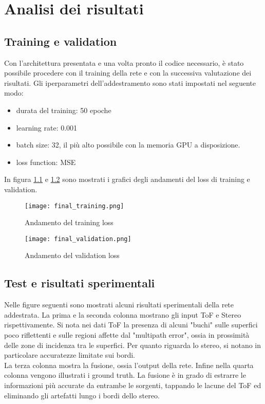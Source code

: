 \chapter{Analisi dei risultati}

\section{Training e validation}
Con l'architettura presentata e una volta pronto il codice necessario, è stato possibile procedere con il training della rete e con la successiva valutazione dei risultati.
Gli iperparametri dell'addestramento sono stati impostati nel seguente modo:
\begin{itemize}
    \item durata del training: 50 epoche
    \item learning rate: 0.001
    \item batch size: 32, il più alto possibile con la memoria GPU a disposizione.
    \item loss function: MSE
\end{itemize}
In figura \ref{training} e \ref{validation} sono mostrati i grafici degli andamenti del loss di training e validation.
\begin{figure}[H]
    \centering
    \texttt{[image: final\_training.png]}
    \caption[Andamento del training loss]{Andamento del training loss}
    \label{training}
\end{figure}

\begin{figure}[H]
    \centering
    \texttt{[image: final\_validation.png]}
    \caption[Andamento del validation loss]{Andamento del validation loss}
    \label{validation}
\end{figure}

\section{Test e risultati sperimentali}
Nelle figure seguenti sono mostrati alcuni risultati sperimentali della rete addestrata. La prima e la seconda colonna mostrano gli input ToF e Stereo rispettivamente. Si nota nei dati ToF la presenza di alcuni "buchi" sulle superfici poco riflettenti e sulle regioni affette dal "multipath error", ossia in prossimità delle zone di incidenza tra le superfici. Per quanto riguarda lo stereo, si notano in particolare accuratezze limitate sui bordi.\\
La terza colonna mostra la fusione, ossia l'output della rete. Infine nella quarta colonna vengono illustrati i ground truth. La fusione è in grado di estrarre le informazioni più accurate da entrambe le sorgenti, tappando le lacune del ToF ed eliminando gli artefatti lungo i bordi dello stereo. \\

